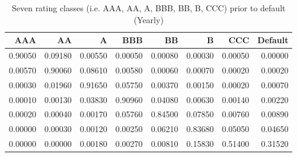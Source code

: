 \begin{table}[H]
\caption{Seven rating classes (i.e. AAA, AA, A, BBB, BB, B, CCC) prior to default (Yearly)}
\label{tab:Transition Matrix}
\begin{tabular}{rrrrrrrr}
\toprule
AAA & AA & A & BBB & BB & B & CCC & Default \\
\midrule
0.90050 & 0.09180 & 0.00550 & 0.00050 & 0.00080 & 0.00030 & 0.00050 & 0.00000 \\
0.00570 & 0.90060 & 0.08610 & 0.00580 & 0.00060 & 0.00070 & 0.00020 & 0.00020 \\
0.00030 & 0.01960 & 0.91650 & 0.05750 & 0.00370 & 0.00150 & 0.00020 & 0.00070 \\
0.00010 & 0.00130 & 0.03830 & 0.90960 & 0.04080 & 0.00630 & 0.00140 & 0.00220 \\
0.00020 & 0.00040 & 0.00170 & 0.05760 & 0.84500 & 0.07850 & 0.00760 & 0.00890 \\
0.00000 & 0.00030 & 0.00120 & 0.00250 & 0.06210 & 0.83680 & 0.05050 & 0.04650 \\
0.00000 & 0.00000 & 0.00180 & 0.00270 & 0.00810 & 0.15830 & 0.51400 & 0.31520 \\
\bottomrule
\end{tabular}
\end{table}
